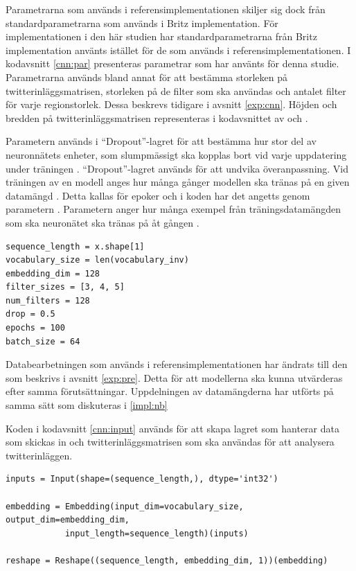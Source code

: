 \documentclass{kaumasters} %
\begin{document}
Parametrarna som används i referensimplementationen skiljer sig dock från standardparametrarna som används i Britz implementation. För implementationen i den här studien har standardparametrarna från Britz implementation använts istället för de som används i referensimplementationen. I kodavsnitt \ref{cnn:par} presenteras parametrar som har använts för denna studie. Parametrarna används bland annat för att bestämma storleken på twitterinläggsmatrisen, storleken på de filter som ska användas och antalet filter för varje regionstorlek. Dessa beskrevs tidigare i avsnitt \ref{exp:cnn}. Höjden och bredden på twitterinläggsmatrisen representeras i kodavsnittet av  och .

Parametern  används i “Dropout”-lagret för att bestämma hur stor del av neuronnätets enheter, som slumpmässigt ska kopplas bort vid varje uppdatering under träningen \cite{impcnn:006}. “Dropout”-lagret används för att undvika överanpassning. Vid träningen av en modell anges hur många gånger modellen ska tränas på en given datamängd \cite{impcnn:007}. Detta kallas för epoker och i koden har det angetts genom parametern . Parametern  anger hur många exempel från träningsdatamängden som ska neuronätet ska tränas på åt gången \cite{impcnn:007}.

\begin{lstlisting}[style=mypython,caption={Parameterurval för CNN.},label=cnn:par]
sequence_length = x.shape[1]
vocabulary_size = len(vocabulary_inv)
embedding_dim = 128
filter_sizes = [3, 4, 5]
num_filters = 128
drop = 0.5
epochs = 100
batch_size = 64
\end{lstlisting}

Databearbetningen som används i referensimplementationen har ändrats till den som beskrivs i avsnitt \ref{exp:pre}. Detta för att modellerna ska kunna utvärderas efter samma förutsättningar. Uppdelningen av datamängderna har utförts på samma sätt som diskuteras i \ref{impl:nb}

Koden i kodavsnitt \ref{cnn:input} används för att skapa lagret som hanterar data som skickas in och twitterinläggsmatrisen som ska användas för att analysera twitterinläggen.

\begin{lstlisting}[style=mypython,caption={Kod för att skapa indata-lagret och twitterinläggsmatrisen.},label=cnn:input]
inputs = Input(shape=(sequence_length,), dtype='int32')

embedding = Embedding(input_dim=vocabulary_size, output_dim=embedding_dim,
			input_length=sequence_length)(inputs)
			
reshape = Reshape((sequence_length, embedding_dim, 1))(embedding)
\end{lstlisting}
\end{document}
